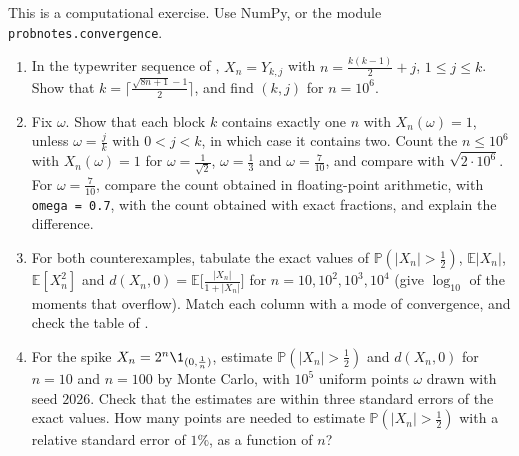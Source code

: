 \begin{exercise}\label{ex:ll-typewriter-numerics}
\medium This is a computational exercise. Use NumPy, or the module
\texttt{probnotes.convergence}.
\begin{enumerate}[label=(\alph*)]
  \item In the typewriter sequence of , $X_n=Y_{k,j}$ with
    $n=\frac{k(k-1)}2+j$, $1\le j\le k$. Show that
    $k=\big\lceil\frac{\sqrt{8n+1}-1}2\big\rceil$, and find $(k,j)$ for $n=10^6$.
  \item Fix $\omega$. Show that each block $k$ contains exactly one $n$ with $X_n(\omega)=1$,
    unless $\omega=\frac jk$ with $0<j<k$, in which case it contains two. Count the
    $n\le10^6$ with $X_n(\omega)=1$ for $\omega=\frac1{\sqrt2}$, $\omega=\frac13$ and
    $\omega=\frac7{10}$, and compare with $\sqrt{2\cdot10^6}$. For $\omega=\frac7{10}$, compare
    the count obtained in floating-point arithmetic, with \texttt{omega = 0.7}, with the count
    obtained with exact fractions, and explain the difference.
  \item For both counterexamples, tabulate the exact values of $\mathbb P(|X_n|>\frac12)$,
    $\mathbb E|X_n|$, $\mathbb E[X_n^2]$ and $d(X_n,0)=\mathbb E\big[\frac{|X_n|}{1+|X_n|}\big]$ for
    $n=10,10^2,10^3,10^4$ (give $\log_{10}$ of the moments that overflow). Match each column
    with a mode of convergence, and check the table of .
  \item For the spike $X_n=2^n\1_{(0,\frac1n)}$, estimate $\mathbb P(|X_n|>\frac12)$ and
    $d(X_n,0)$ for $n=10$ and $n=100$ by Monte Carlo, with $10^5$ uniform points $\omega$ drawn
    with seed $2026$. Check that the estimates are within three standard errors of the exact
    values. How many points are needed to estimate $\mathbb P(|X_n|>\frac12)$ with a relative
    standard error of $1\%$, as a function of $n$?
\end{enumerate}
\end{exercise}

